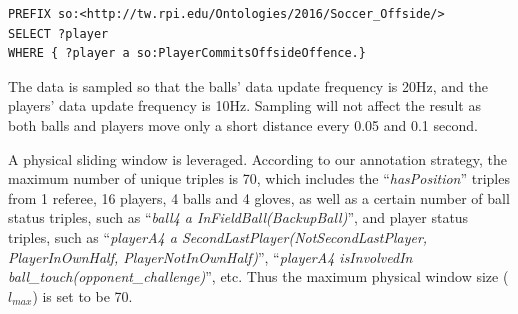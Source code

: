 \begin{lstlisting}[language=SPARQL,caption={Offside Offence Detection Query},basicstyle=\small,frame=single]
PREFIX so:<http://tw.rpi.edu/Ontologies/2016/Soccer_Offside/>
SELECT ?player 
WHERE { ?player a so:PlayerCommitsOffsideOffence.}
\end{lstlisting}

The data is sampled so that the balls' data update frequency is 20Hz, and the players' data update frequency is 10Hz.
Sampling will not affect the result as both balls and players move only a short distance every 0.05 and 0.1 second.

A physical sliding window is leveraged.
According to our annotation strategy, the maximum number of unique triples is 70, which includes the ``\textit{hasPosition}'' triples from 1 referee, 16 players, 4 balls and 4 gloves, as well as a certain number of ball status triples, such as ``\textit{ball4 a InFieldBall(BackupBall)}'', and player status triples, such as ``\textit{playerA4 a SecondLastPlayer(NotSecondLastPlayer, PlayerInOwnHalf, PlayerNotInOwnHalf)}'', ``\textit{playerA4 isInvolvedIn ball\_touch(opponent\_challenge)}'', etc. 
Thus the maximum physical window size ($l_{max}$) is set to be 70.


